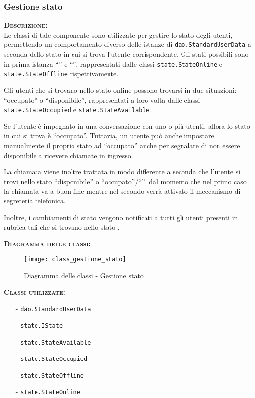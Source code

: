 \subsubsection{Gestione stato}
\begin{description}
	\item{\scshape\bfseries Descrizione:}\\
Le classi di tale componente sono utilizzate per gestire lo stato degli utenti, permettendo un comportamento diverso delle istanze di \texttt{dao.StandardUserData} a seconda dello stato in cui si trova l'utente corrispondente. Gli stati possibili sono in prima istanza ``'' e ``'', rappresentati dalle classi \texttt{state.StateOnline} e \texttt{state.StateOffline} rispettivamente.

Gli utenti che si trovano nello stato online possono trovarsi in due situazioni: ``occupato'' o ``disponibile'', rappresentati a loro volta dalle classi \texttt{state.StateOccupied} e \texttt{state.StateAvailable}.

Se l'utente è impegnato in una conversazione con uno o più utenti, allora lo stato in cui si trova è ``occupato''. Tuttavia, un utente può anche impostare manualmente il proprio stato ad ``occupato'' anche per segnalare di non essere disponibile a ricevere chiamate in ingresso.
	
La chiamata viene inoltre trattata in modo differente a seconda che l'utente si trovi nello stato ``disponibile'' o ``occupato''/``'', dal momento che nel primo caso la chiamata va a buon fine mentre nel secondo verrà attivato il meccanismo di segreteria telefonica.
	
Inoltre, i cambiamenti di stato vengono notificati a tutti gli utenti presenti in rubrica tali che si trovano nello stato .
	\item{\scshape\bfseries Diagramma delle classi:}
	\begin{figure}[H]
\begin{center}
\texttt{[image: class\_gestione\_stato]}
\caption{Diagramma delle classi - Gestione stato}\label{fig:gestione_stato}
\end{center}
\end{figure}
	
	\item{\scshape\bfseries Classi utilizzate:}\\ 
	\begin{itemize}[noitemsep,nolistsep]
		\item[-] \texttt{dao.StandardUserData}
	    \item[-] \texttt{state.IState}
	    \item[-] \texttt{state.StateAvailable}
	    \item[-] \texttt{state.StateOccupied}
	    \item[-] \texttt{state.StateOffline}
	    \item[-] \texttt{state.StateOnline}
	\end{itemize}
\end{description}


